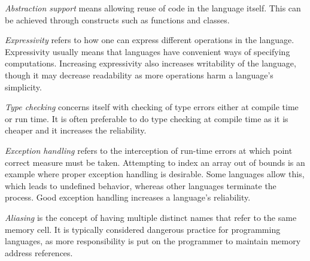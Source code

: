 \textit{Abstraction support} means allowing reuse of code in the language itself. 
This can be achieved through constructs such as functions and classes.

\textit{Expressivity} refers to how one can express different operations in the language.
Expressivity usually means that languages have convenient ways of specifying computations. 
Increasing expressivity also increases writability of the language, though it may decrease readability as more operations harm a language's simplicity.
 
\textit{Type checking} concerns itself with checking of type errors either at compile time or run time. 
It is often preferable to do type checking at compile time as it is cheaper and it increases the reliability.

\textit{Exception handling} refers to the interception of run-time errors at which point correct measure must be taken. 
Attempting to index an array out of bounds is an example where proper exception handling is desirable.
Some languages allow this, which leads to undefined behavior, whereas other languages terminate the process.
Good exception handling increases a language's reliability.

\textit{Aliasing} is the concept of having multiple distinct names that refer to the same memory cell. 
It is typically considered dangerous practice for programming languages, as more responsibility is put on the programmer to maintain memory address references.